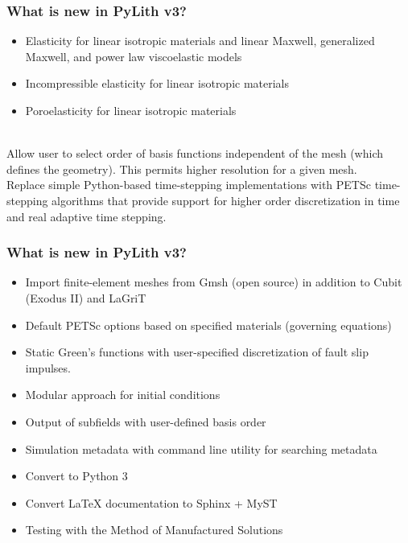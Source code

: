 \documentclass[aspectratio=169]{beamer}
\begin{document}
\begin{frame}
  \frametitle{What is new in PyLith v3?}
  \summary{}

  \begin{itemize}
    \begin{itemize}
    \item Elasticity for linear isotropic materials and linear Maxwell, generalized Maxwell, and power law viscoelastic models
    \item Incompressible elasticity for linear isotropic materials
    \item Poroelasticity for linear isotropic materials
    \end{itemize}
     \\
    Allow user to select order of basis functions independent of the mesh (which defines the geometry). This permits higher resolution for a given mesh.
     \\
    Replace simple Python-based time-stepping implementations with PETSc time-stepping algorithms that provide support for higher order discretization in time and real adaptive time stepping.
  \end{itemize}

\end{frame}


\begin{frame}
  \frametitle{What is new in PyLith v3?}
  \summary{}

  \begin{itemize}
  \item Import finite-element meshes from Gmsh (open source) in addition to Cubit (Exodus II) and LaGriT
  \item Default PETSc options based on specified materials (governing equations)
  \item Static Green's functions with user-specified discretization of fault slip impulses.
  \item Modular approach for initial conditions
  \item Output of subfields with user-defined basis order
  \item Simulation metadata with command line utility for searching metadata
  \item Convert to Python 3
  \item Convert LaTeX documentation to Sphinx + MyST
  \item Testing with the Method of Manufactured Solutions
\end{itemize}

\end{frame}
\end{document}
